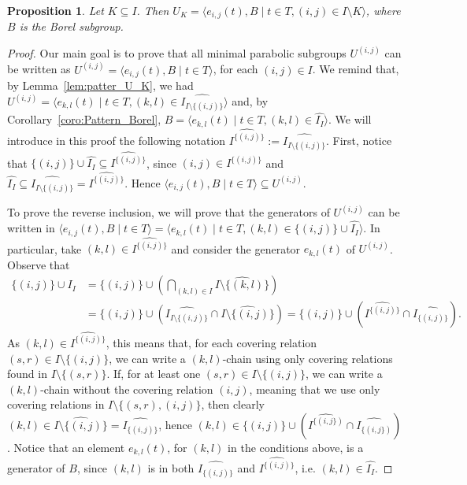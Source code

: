 \documentclass[11pt,letterpaper]{amsart}
\newtheorem{proposition}[theorem]{Proposition}
\begin{document}
\begin{proposition}\label{prop:Patter_U_K_redefin}
Let $K\subseteq I$. Then
 $U_K = \langle e_{i,j}(t), B\mid t\in T,(i,j)\in I\setminus K\rangle$, where $B$ is the Borel subgroup.
\end{proposition}
\begin{proof}
Our main goal is to prove that all minimal parabolic subgroups $U^{(i,j)}$ can be written as $U^{(i,j)}= \langle e_{i,j}(t), B\mid t\in T\rangle$, for each $(i,j)\in I$.
We remind that, by Lemma~\ref{lem:patter_U_K}, we had  $U^{(i,j)}= \langle e_{k,l}(t)\mid t\in T, (k,l)\in \widehat{I_{I\setminus\{(i,j)\}}}\rangle$ and, by Corollary~\ref{coro:Pattern_Borel}, $B=\langle e_{k,l}(t)\mid t\in T, (k,l)\in \widehat{I_I}\rangle$.
We will introduce in this proof the following notation $\widehat{I^{\{(i,j)\}}}:=\widehat{I_{I\setminus\{(i,j)\}}}$.
First, notice that $\{(i,j)\}\cup \widehat{I_I} \subseteq \widehat{I^{\{(i,j)\}}}$, since $(i,j)\in \widehat{I^{\{(i,j)\}}}$ and $\widehat{I_I}\subseteq \widehat{I_{I\setminus\{(i,j)\}}}=\widehat{I^{\{(i,j)\}}}$.
Hence $\langle e_{i,j}(t), B\mid t\in T\rangle\subseteq U^{(i,j)}$.

To prove the reverse inclusion, we will prove that the generators of $U^{(i,j)}$ can be written in $\langle e_{i,j}(t), B\mid t\in T\rangle =\langle e_{k,l}(t)\mid t\in T, (k,l)\in \{(i,j)\}\cup \widehat{I_I}\rangle $.
In particular, take $(k,l)\in \widehat{I^{\{(i,j)\}}}$ and consider the generator $e_{k,l}(t)$ of $U^{(i,j)}$. 
Observe that 
\begin{align*}
    \{(i,j)\}\cup I_I &= \{(i,j)\}\cup \left(\bigcap_{(k,l)\in I} \widehat{I\setminus\{(k,l)\}}\right) \\ &=  \{(i,j)\}\cup (\widehat{I_{I\setminus\{(i,j)\}}}\cap \widehat{I\setminus\{(i,j)\}}) = \{(i,j)\}\cup (\widehat{I^{\{(i,j)\}}}\cap \widehat{I_{\{(i,j)\}}}).
\end{align*}
As $(k,l)\in \widehat{I^{\{(i,j)\}}}$, this means that, for each covering relation $(s,r)\in I\setminus\{(i,j)\}$, we can write a $(k,l)$-chain using only covering relations found in $I\setminus\{(s,r)\}$. If, for at least one $(s,r)\in I\setminus\{(i,j)\}$, we can write a $(k,l)$-chain without the covering relation $(i,j)$, meaning that we use only covering relations in $I\setminus\{(s,r),(i,j)\}$, then clearly $(k,l)\in \widehat{I\setminus\{(i,j)\}} = \widehat{I_{\{(i,j)\}}}$, hence $(k,l)\in \{(i,j)\}\cup (\widehat{I^{\{(i,j\})}}\cap \widehat{I_{\{(i,j\})}})$. Notice that an element $e_{k,l}(t)$, for $(k,l)$ in the conditions above, is a generator of $B$, since $(k,l)$ is in both $\widehat{I_{\{(i,j)\}}}$ and $\widehat{I^{\{(i,j)\}}}$, i.e. $(k,l)\in \widehat{I_I}$.


\end{proof}
\end{document}
